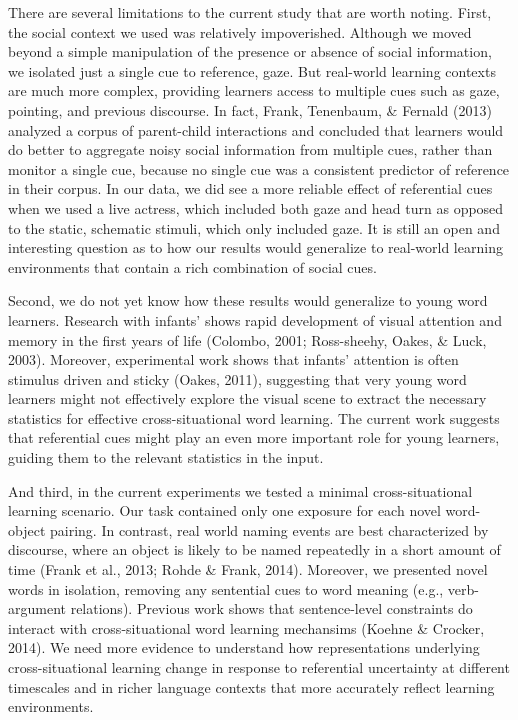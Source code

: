 \documentclass[a4paper,man,floatsintext]{apa6}
\begin{document}
There are several limitations to the current study that are worth
noting. First, the social context we used was relatively impoverished.
Although we moved beyond a simple manipulation of the presence or
absence of social information, we isolated just a single cue to
reference, gaze. But real-world learning contexts are much more complex,
providing learners access to multiple cues such as gaze, pointing, and
previous discourse. In fact, Frank, Tenenbaum, \& Fernald (2013)
analyzed a corpus of parent-child interactions and concluded that
learners would do better to aggregate noisy social information from
multiple cues, rather than monitor a single cue, because no single cue
was a consistent predictor of reference in their corpus. In our data, we
did see a more reliable effect of referential cues when we used a live
actress, which included both gaze and head turn as opposed to the
static, schematic stimuli, which only included gaze. It is still an open
and interesting question as to how our results would generalize to
real-world learning environments that contain a rich combination of
social cues.

Second, we do not yet know how these results would generalize to young
word learners. Research with infants' shows rapid development of visual
attention and memory in the first years of life (Colombo, 2001;
Ross-sheehy, Oakes, \& Luck, 2003). Moreover, experimental work shows
that infants' attention is often stimulus driven and sticky (Oakes,
2011), suggesting that very young word learners might not effectively
explore the visual scene to extract the necessary statistics for
effective cross-situational word learning. The current work suggests
that referential cues might play an even more important role for young
learners, guiding them to the relevant statistics in the input.

And third, in the current experiments we tested a minimal
cross-situational learning scenario. Our task contained only one
exposure for each novel word-object pairing. In contrast, real world
naming events are best characterized by discourse, where an object is
likely to be named repeatedly in a short amount of time (Frank et al.,
2013; Rohde \& Frank, 2014). Moreover, we presented novel words in
isolation, removing any sentential cues to word meaning (e.g.,
verb-argument relations). Previous work shows that sentence-level
constraints do interact with cross-situational word learning mechansims
(Koehne \& Crocker, 2014). We need more evidence to understand how
representations underlying cross-situational learning change in response
to referential uncertainty at different timescales and in richer
language contexts that more accurately reflect learning environments.
\end{document}

